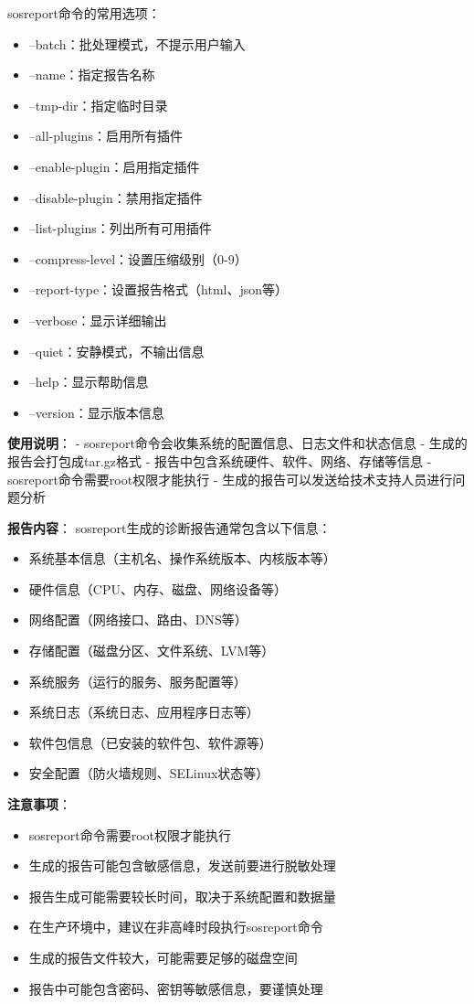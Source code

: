 \documentclass[12pt,UTF8]{ctexbook}
\begin{document}
sosreport命令的常用选项：
\begin{itemize}
    \item --batch：批处理模式，不提示用户输入
    \item --name：指定报告名称
    \item --tmp-dir：指定临时目录
    \item --all-plugins：启用所有插件
    \item --enable-plugin：启用指定插件
    \item --disable-plugin：禁用指定插件
    \item --list-plugins：列出所有可用插件
    \item --compress-level：设置压缩级别（0-9）
    \item --report-type：设置报告格式（html、json等）
    \item --verbose：显示详细输出
    \item --quiet：安静模式，不输出信息
    \item --help：显示帮助信息
    \item --version：显示版本信息
\end{itemize}

\textbf{使用说明}：
- sosreport命令会收集系统的配置信息、日志文件和状态信息
- 生成的报告会打包成tar.gz格式
- 报告中包含系统硬件、软件、网络、存储等信息
- sosreport命令需要root权限才能执行
- 生成的报告可以发送给技术支持人员进行问题分析

\textbf{报告内容}：
sosreport生成的诊断报告通常包含以下信息：
\begin{itemize}
    \item 系统基本信息（主机名、操作系统版本、内核版本等）
    \item 硬件信息（CPU、内存、磁盘、网络设备等）
    \item 网络配置（网络接口、路由、DNS等）
    \item 存储配置（磁盘分区、文件系统、LVM等）
    \item 系统服务（运行的服务、服务配置等）
    \item 系统日志（系统日志、应用程序日志等）
    \item 软件包信息（已安装的软件包、软件源等）
    \item 安全配置（防火墙规则、SELinux状态等）
\end{itemize}

\textbf{注意事项}：
\begin{itemize}
    \item sosreport命令需要root权限才能执行
    \item 生成的报告可能包含敏感信息，发送前要进行脱敏处理
    \item 报告生成可能需要较长时间，取决于系统配置和数据量
    \item 在生产环境中，建议在非高峰时段执行sosreport命令
    \item 生成的报告文件较大，可能需要足够的磁盘空间
    \item 报告中可能包含密码、密钥等敏感信息，要谨慎处理
\end{itemize}
\end{document}
